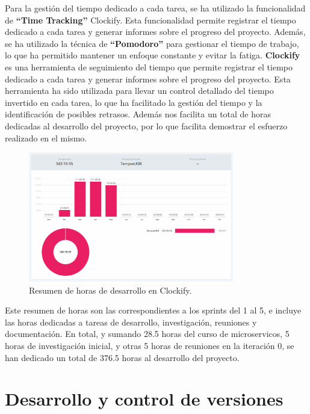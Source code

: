 Para la gestión del tiempo dedicado a cada tarea, se ha utilizado la funcionalidad de \textbf{``Time Tracking''} Clockify. Esta funcionalidad permite registrar el tiempo dedicado a cada tarea y generar informes sobre el progreso del proyecto. Además, se ha utilizado la técnica de \textbf{``Pomodoro''} para gestionar el tiempo de trabajo, lo que ha permitido mantener un enfoque constante y evitar la fatiga.
\newline\newline
\textbf{Clockify}\cite{clockify} es una herramienta de seguimiento del tiempo que permite registrar el tiempo dedicado a cada tarea y generar informes sobre el progreso del proyecto. Esta herramienta ha sido utilizada para llevar un control detallado del tiempo invertido en cada tarea, lo que ha facilitado la gestión del tiempo y la identificación de posibles retrasos.
Además nos facilita un total de horas dedicadas al desarrollo del proyecto, por lo que facilita demostrar el esfuerzo realizado en el mismo.

\begin{figure}[H] 
    \centering 
    \includegraphics[width=0.8\textwidth]{figures/05_clockify.png}
    \caption{Resumen de horas de desarrollo en Clockify.} %
    \label{clockify} %
\end{figure}

Este resumen de horas son las correspondientes a los sprints del 1 al 5, e incluye las horas dedicadas a tareas de desarrollo, investigación, reuniones y documentación. En total, y sumando 28.5 horas del curso de microservicos, 5 horas de investigación inicial, y otras 5 horas de reuniones en la iteración 0, se han dedicado un total de 376.5 horas al desarrollo del proyecto.

\section{Desarrollo y control de versiones}

